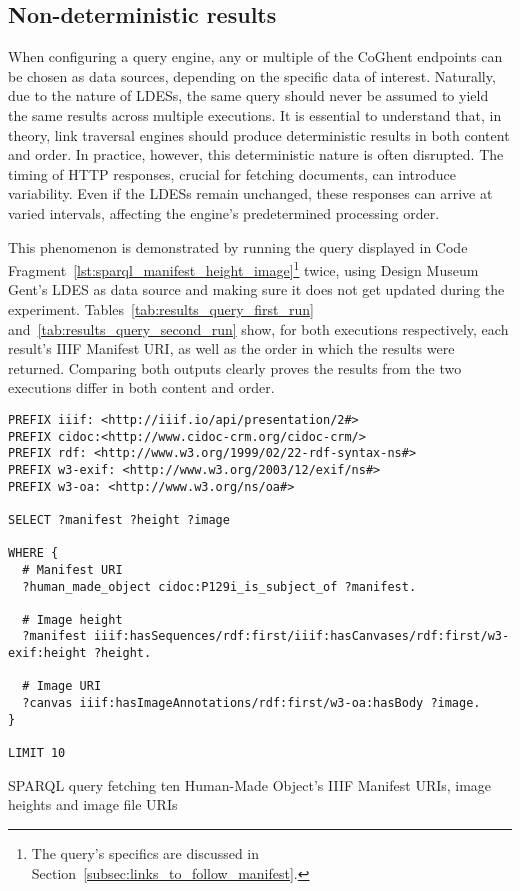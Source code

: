 \subsection{Non-deterministic results}
\label{subsec:non_deterministic_results}

When configuring a query engine, any or multiple of the CoGhent endpoints can be chosen as data sources, depending on the specific data of interest. Naturally, due to the nature of LDESs, the same query should never be assumed to yield the same results across multiple executions. It is essential to understand that, in theory, link traversal engines should produce deterministic results in both content and order. In practice, however, this deterministic nature is often disrupted. The timing of HTTP responses, crucial for fetching documents, can introduce variability. Even if the LDESs remain unchanged, these responses can arrive at varied intervals, affecting the engine's predetermined processing order.

This phenomenon is demonstrated by running the query displayed in Code Fragment~\ref{lst:sparql_manifest_height_image}\footnote{The query's specifics are discussed in Section~\ref{subsec:links_to_follow_manifest}.} twice, using Design Museum Gent's LDES as data source and making sure it does not get updated during the experiment. Tables~\ref{tab:results_query_first_run} and~\ref{tab:results_query_second_run} show, for both executions respectively, each result's IIIF Manifest URI, as well as the order in which the results were returned. Comparing both outputs clearly proves the results from the two executions differ in both content and order.

\begin{listing}[htbp]
    \begin{verbatim}
PREFIX iiif: <http://iiif.io/api/presentation/2#>
PREFIX cidoc:<http://www.cidoc-crm.org/cidoc-crm/>
PREFIX rdf: <http://www.w3.org/1999/02/22-rdf-syntax-ns#>
PREFIX w3-exif: <http://www.w3.org/2003/12/exif/ns#>
PREFIX w3-oa: <http://www.w3.org/ns/oa#>

SELECT ?manifest ?height ?image

WHERE {
  # Manifest URI
  ?human_made_object cidoc:P129i_is_subject_of ?manifest.
  
  # Image height
  ?manifest iiif:hasSequences/rdf:first/iiif:hasCanvases/rdf:first/w3-exif:height ?height.
  
  # Image URI
  ?canvas iiif:hasImageAnnotations/rdf:first/w3-oa:hasBody ?image.
}

LIMIT 10
    \end{verbatim}
    \caption{SPARQL query fetching ten Human-Made Object's IIIF Manifest URIs, image heights and image file URIs}
    \label{lst:sparql_manifest_height_image}
\end{listing}

